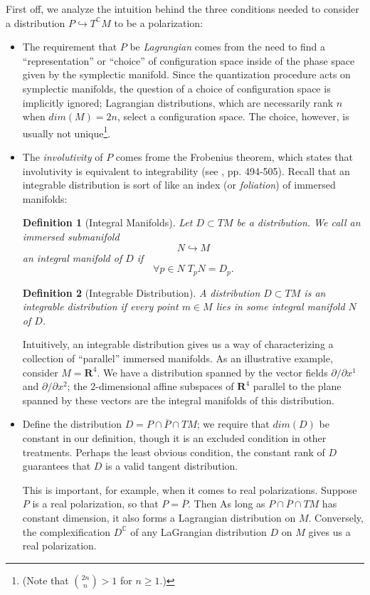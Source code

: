 \documentclass{tufte-handout}
\newtheorem{defn}{Definition}
\begin{document}
First off, we analyze the intuition behind the three conditions needed to consider a distribution $P \hookrightarrow T^\mathbb{C}M$ to be a polarization:
\begin{itemize}
\item The requirement that $P$ be \emph{Lagrangian} comes from the need to find a ``representation'' or ``choice'' of configuration space inside of the phase space given by the symplectic manifold. Since the quantization procedure acts on symplectic manifolds, the question of a choice of configuration space is implicitly ignored; Lagrangian distributions, which are necessarily rank $n$ when $dim(M) = 2n$, select a configuration space. The choice, however, is usually not unique\footnote{(Note that ${2n \choose n} > 1$ for $n \geq 1$.)}.

\item The \emph{involutivity} of $P$ comes frome the Frobenius theorem, which states that involutivity is equivalent to integrability (see \cite{lee}, pp. 494-505). Recall that an integrable distribution is sort of like an index (or \emph{foliation}) of immersed manifolds:
\begin{fullwidth}
\begin{defn}[Integral Manifolds]
Let $D \subset TM$ be a distribution. We call an immersed submanifold
$$
N \hookrightarrow M
$$
an \emph{integral manifold} of $D$ if
$$
\forall p \in N \; T_p N = D_p.
$$
\end{defn}
\begin{defn}[Integrable Distribution]
A distribution $D \subset TM$ is an \emph{integrable} distribution if every point $m \in M$ lies in some integral manifold $N$ of $D$.
\end{defn}
\end{fullwidth}
Intuitively, an integrable distribution gives us a way of characterizing a collection of ``parallel'' immersed manifolds. As an illustrative example, consider $M = \mathbf{R}^4$. We have a distribution spanned by the vector fields $\partial / \partial x^1$ and $\partial / \partial x^2$; the 2-dimensional affine subspaces of $\mathbf{R}^4$ parallel to the plane spanned by these vectors are the integral manifolds of this distribution.

\item Define the distribution $D = P \cap \overline{P} \cap TM$; we require that $dim(D)$ be constant in our definition, though it is an excluded condition in other treatments. Perhaps the least obvious condition, the constant rank of $D$ guarantees that $D$ is a valid tangent distribution.

This is important, for example, when it comes to real polarizations. Suppose $P$ is a real polarization, so that $P = \overline{P}$. Then As long as $P \cap \overline{P} \cap TM$ has constant dimension, it also forms a Lagrangian distribution on $M$. Conversely, the complexification $D^{\mathbb{C}}$ of any LaGrangian distribution $D$ on $M$ gives us a real polarization.
\end{itemize}
\end{document}
